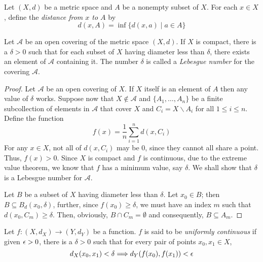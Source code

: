 \begin{definition}
    Let $(X,d)$ be a metric space and $A$ be a nonempty subset of $X$. For each $x\in X$, define the \textit{distance from $x$ to $A$} by 
    \begin{equation*}
        d(x, A) = \inf\{d(x,a)\mid a\in A\}
    \end{equation*}
\end{definition}

\begin{lemma}
    Let $\mathscr{A}$ be an open covering of the metric space $(X,d)$. If $X$ is compact, there is a $\delta > 0$ such that for each subset of $X$ having diameter less than $\delta$, there exists an element of $\mathscr{A}$ containing it. The number $\delta$ is called a \textit{Lebesgue number} for the covering $\mathscr{A}$.
\end{lemma}
\begin{proof}
    Let $\mathscr{A}$ be an open covering of $X$. If $X$ itself is an element of $A$ then any value of $\delta$ works. Suppose now that $X\notin\mathscr{A}$ and $\{A_1,\ldots,A_n\}$ be a finite subcollection of elements in $\mathscr{A}$ that cover $X$ and $C_i = X\backslash A_i$ for all $1\le i\le n$. Define the function 
    \begin{equation*}
        f(x) = \frac{1}{n}\sum_{i=1}^nd(x, C_i)
    \end{equation*}
    For any $x\in X$, not all of $d(x,C_i)$ may be $0$, since they cannot all share a point. Thus, $f(x) > 0$. Since $X$ is compact and $f$ is continuous, due to the extreme value theorem, we know that $f$ has a minimum value, say $\delta$. We shall show that $\delta$ is a Lebesgue number for $\mathscr{A}$.

    Let $B$ be a subset of $X$ having diameter less than $\delta$. Let $x_0\in B$; then $B\subseteq B_d(x_0, \delta)$, further, since $f(x_0)\ge\delta$, we must have an index $m$ such that $d(x_0, C_m)\ge\delta$. Then, obviously, $B\cap C_m =\emptyset$ and consequently, $B\subseteq A_m$.
\end{proof}

\begin{definition}
    Let $f:(X, d_X)\to (Y,d_Y)$ be a function. $f$ is said to be \textit{uniformly continuous} if given $\epsilon > 0$, there is a $\delta > 0$ such that for every pair of points $x_0, x_1\in X$,
    \begin{equation*}
        d_X(x_0, x_1) < \delta\Longrightarrow d_Y(f(x_0), f(x_1)) < \epsilon
    \end{equation*}
\end{definition}

